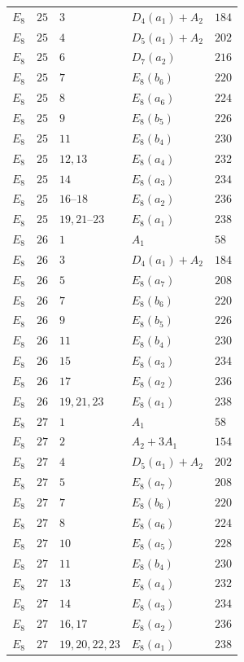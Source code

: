 \documentclass[11pt,a4paper]{amsart}
\numberwithin{equation}{section}
\theoremstyle{definition}
\theoremstyle{remark}
\begin{document}
{\begin{longtable}{@{}p{}p{}p{}p{}p{}@{}}
$E_{8}$&$25$&$3$&$D_{4}(a_{1})+A_{2}$&$184$\\
$E_{8}$&$25$&$4$&$D_{5}(a_{1})+A_{2}$&$202$\\
$E_{8}$&$25$&$6$&$D_{7}(a_{2})$&$216$\\
$E_{8}$&$25$&$7$&$E_{8}(b_{6})$&$220$\\
$E_{8}$&$25$&$8$&$E_{8}(a_{6})$&$224$\\
$E_{8}$&$25$&$9$&$E_{8}(b_{5})$&$226$\\
$E_{8}$&$25$&$11$&$E_{8}(b_{4})$&$230$\\
$E_{8}$&$25$&$12,13$&$E_{8}(a_{4})$&$232$\\
$E_{8}$&$25$&$14$&$E_{8}(a_{3})$&$234$\\
$E_{8}$&$25$&$16\text{--}18$&$E_{8}(a_{2})$&$236$\\
$E_{8}$&$25$&$19,21\text{--}23$&$E_{8}(a_{1})$&$238$\\
$E_{8}$&$26$&$1$&$A_{1}$&$58$\\
$E_{8}$&$26$&$3$&$D_{4}(a_{1})+A_{2}$&$184$\\
$E_{8}$&$26$&$5$&$E_{8}(a_{7})$&$208$\\
$E_{8}$&$26$&$7$&$E_{8}(b_{6})$&$220$\\
$E_{8}$&$26$&$9$&$E_{8}(b_{5})$&$226$\\
$E_{8}$&$26$&$11$&$E_{8}(b_{4})$&$230$\\
$E_{8}$&$26$&$15$&$E_{8}(a_{3})$&$234$\\
$E_{8}$&$26$&$17$&$E_{8}(a_{2})$&$236$\\
$E_{8}$&$26$&$19,21,23$&$E_{8}(a_{1})$&$238$\\
$E_{8}$&$27$&$1$&$A_{1}$&$58$\\
$E_{8}$&$27$&$2$&$A_{2}+3A_{1}$&$154$\\
$E_{8}$&$27$&$4$&$D_{5}(a_{1})+A_{2}$&$202$\\
$E_{8}$&$27$&$5$&$E_{8}(a_{7})$&$208$\\
$E_{8}$&$27$&$7$&$E_{8}(b_{6})$&$220$\\
$E_{8}$&$27$&$8$&$E_{8}(a_{6})$&$224$\\
$E_{8}$&$27$&$10$&$E_{8}(a_{5})$&$228$\\
$E_{8}$&$27$&$11$&$E_{8}(b_{4})$&$230$\\
$E_{8}$&$27$&$13$&$E_{8}(a_{4})$&$232$\\
$E_{8}$&$27$&$14$&$E_{8}(a_{3})$&$234$\\
$E_{8}$&$27$&$16,17$&$E_{8}(a_{2})$&$236$\\
$E_{8}$&$27$&$19,20,22,23$&$E_{8}(a_{1})$&$238$\\

\end{longtable}}
\end{document}
